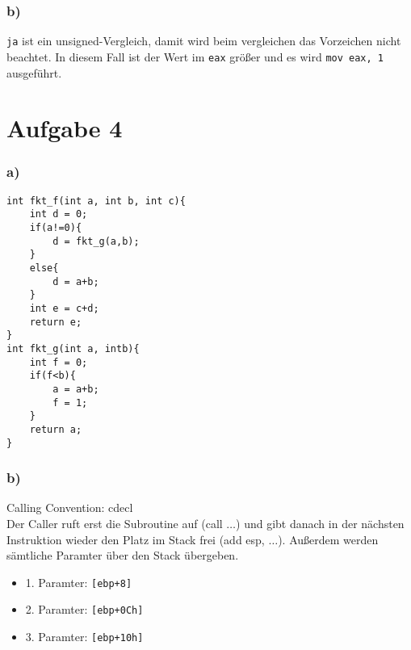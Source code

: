 \documentclass[]{scrreprt}
\begin{document}
\subsection*{b)}
\texttt{ja} ist ein unsigned-Vergleich, damit wird beim vergleichen das Vorzeichen nicht beachtet. In diesem Fall ist der Wert im \texttt{eax} größer und es wird \texttt{mov eax, 1} ausgeführt.
\chapter{Aufgabe 4}
\subsection*{a)}
\begin{lstlisting}[caption={Funktionen f und g},captionpos=b]
int fkt_f(int a, int b, int c){
	int d = 0;
	if(a!=0){
		d = fkt_g(a,b);
	}
	else{
		d = a+b;
	}
	int e = c+d;
	return e;
}
int fkt_g(int a, intb){
	int f = 0;
	if(f<b){
		a = a+b;
		f = 1;
	}
	return a;
}
\end{lstlisting}
\subsection*{b)}
Calling Convention: cdecl\\
Der Caller ruft erst die Subroutine auf (call $\dots$) und gibt danach in der nächsten Instruktion wieder den Platz im Stack frei (add esp, $\dots$). Außerdem werden sämtliche Paramter über den Stack übergeben.
\begin{itemize}
	\item 1. Paramter: \texttt{[ebp+8]}
	\item 2. Paramter: \texttt{[ebp+0Ch]}
	\item 3. Paramter: \texttt{[ebp+10h]}
\end{itemize}
\end{document}
